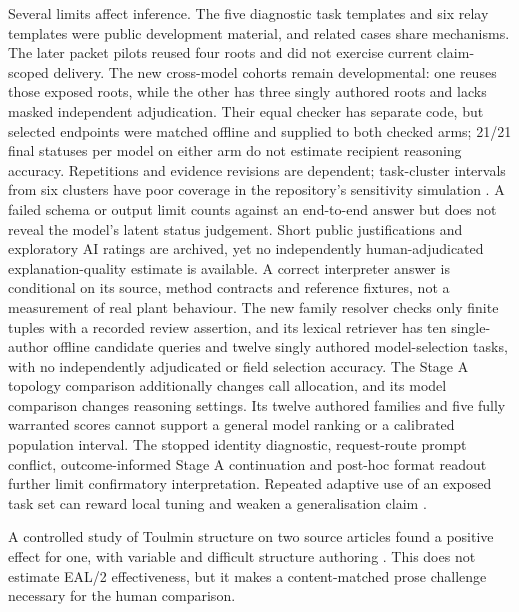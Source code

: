 \documentclass[preprint,12pt]{elsarticle}
\begin{document}
Several limits affect inference. The five diagnostic task templates and six relay templates were public development material, and related cases share mechanisms. The later packet pilots reused four roots and did not exercise current claim-scoped delivery. The new cross-model cohorts remain developmental: one reuses those exposed roots, while the other has three singly authored roots and lacks masked independent adjudication. Their equal checker has separate code, but selected endpoints were matched offline and supplied to both checked arms; 21/21 final statuses per model on either arm do not estimate recipient reasoning accuracy. Repetitions and evidence revisions are dependent; task-cluster intervals from six clusters have poor coverage in the repository's sensitivity simulation \citep{earlRelay}. A failed schema or output limit counts against an end-to-end answer but does not reveal the model's latent status judgement. Short public justifications and exploratory AI ratings are archived, yet no independently human-adjudicated explanation-quality estimate is available. A correct interpreter answer is conditional on its source, method contracts and reference fixtures, not a measurement of real plant behaviour. The new family resolver checks only finite tuples with a recorded review assertion, and its lexical retriever has ten single-author offline candidate queries and twelve singly authored model-selection tasks, with no independently adjudicated or field selection accuracy. The Stage A topology comparison additionally changes call allocation, and its model comparison changes reasoning settings. Its twelve authored families and five fully warranted scores cannot support a general model ranking or a calibrated population interval. The stopped identity diagnostic, request-route prompt conflict, outcome-informed Stage A continuation and post-hoc format readout further limit confirmatory interpretation. Repeated adaptive use of an exposed task set can reward local tuning and weaken a generalisation claim \citep{dwork2015}.

A controlled study of Toulmin structure on two source articles found a positive effect for one, with variable and difficult structure authoring \citep{cheikes2004}. This does not estimate EAL/2 effectiveness, but it makes a content-matched prose challenge necessary for the human comparison.
\end{document}
